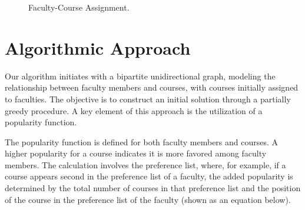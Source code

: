 \documentclass{article}
\begin{document}
\begin{figure}[h]
  \centering
  \caption{Faculty-Course Assignment.}



\end{figure}
\section{Algorithmic Approach}

Our algorithm initiates with a bipartite unidirectional graph, modeling the relationship between faculty members and courses, with courses initially assigned to faculties. The objective is to construct an initial solution through a partially greedy procedure. A key element of this approach is the utilization of a popularity function.

The popularity function is defined for both faculty members and courses. A higher popularity for a course indicates it is more favored among faculty members. The calculation involves the preference list, where, for example, if a course appears second in the preference list of a faculty, the added popularity is determined by the total number of courses in that preference list and the position of the course in the preference list of the faculty (shown as an equation below).
\end{document}
